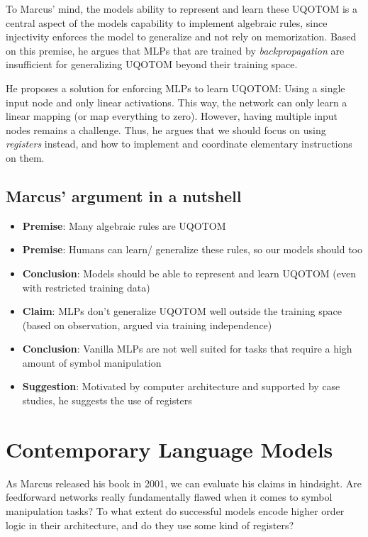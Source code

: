 \documentclass{article}
\theoremstyle{plain}
\theoremstyle{definition}
\begin{document}
To Marcus' mind, the models ability to represent and learn these UQOTOM is a central aspect of the models capability to implement algebraic rules, since injectivity enforces the model to generalize and not rely on memorization. Based on this premise, he argues that MLPs that are trained by \emph{backpropagation} are insufficient for generalizing UQOTOM beyond their training space.

He proposes a solution for enforcing MLPs to learn UQOTOM: Using a single input node and only linear activations. This way, the network can only learn a linear mapping (or map everything to zero). However, having multiple input nodes remains a challenge. Thus, he argues that we should focus on using \emph{registers} instead, and how to implement and coordinate elementary instructions on them.

\subsection*{Marcus' argument in a nutshell}
\begin{itemize}
  \item \textbf{Premise}: Many algebraic rules are UQOTOM
  \item \textbf{Premise}: Humans can learn/ generalize these rules, so our models should too
  \item \textbf{Conclusion}: Models should be able to represent and learn UQOTOM (even with restricted training data)
  \item \textbf{Claim}: MLPs don’t generalize UQOTOM well outside the training space (based on observation, argued via training independence)
  \item \textbf{Conclusion}: Vanilla MLPs are not well suited for tasks that require a high amount of symbol manipulation
  \item \textbf{Suggestion}: Motivated by computer architecture and supported by case studies, he suggests the use of registers
\end{itemize}


\section*{Contemporary Language Models}
As Marcus released his book in 2001, we can evaluate his claims in hindsight. Are feedforward networks really fundamentally flawed when it comes to symbol manipulation tasks? To what extent do successful models encode higher order logic in their architecture, and do they use some kind of registers?
\end{document}
